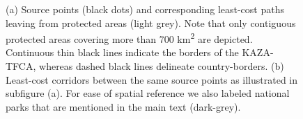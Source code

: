 \documentclass[abstract=on,10pt,a4paper,bibliography=totocnumbered]{scrartcl}
\begin{document}
\begin{figure}[hbtp]
\begin{center}
    \caption{(a) Source points (black dots) and corresponding least-cost paths
    leaving from protected areas (light grey). Note that only contiguous
    protected areas covering more than 700 km\textsuperscript{2} are depicted.
    Continuous thin black lines indicate the borders of the KAZA-TFCA, whereas
    dashed black lines delineate country-borders. (b) Least-cost corridors
    between the same source points as illustrated in subfigure (a). For ease of
    spatial reference we also labeled national parks that are mentioned in the
    main text (dark-grey).}
    \label{LeastCost}
  \end{center}
\end{figure}
\restoregeometry
\end{document}
